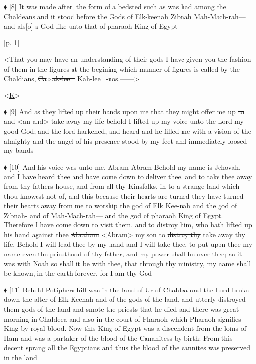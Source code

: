 				$\blacklozenge$ [8]	It was made after, the form of a bedsted such as was had among the Chaldeans and it stood before the Gods of Elk-keenah Zibnah Mah-Mach-rah---and als[o] a God like unto that of pharaoh King of Egypt

				[p. 1]

				<That you may have an understanding of their gods I have given you the fashion of them in the figures at the begining which manner of figures is called by the Chaldians, \sout{Ca$\diamond$ak-lee=} Kah-lee=-nos.------>

				<\uline{K}>

				$\blacklozenge$ [9]	And as they lifted up their hands upon me that they might offer me up \sout{to} \sout{and} <\sout{an} and> take away my life behold I lifted up my voice unto the Lord my \sout{good} God; and the lord harkened, and heard and he filled me with a vision of the almighty and the angel of his presence stood by my feet and immediately loosed my bands

				$\blacklozenge$ [10]	And his voice was unto me. Abram Abram Behold my name is Jehovah. and I have heard thee and have come down to deliver thee. and to take thee away from thy fathers house, and from all thy Kinsfolks, in to a strange land which thou knowest not of, and this because \sout{their} \sout{hearts} \sout{are} \sout{turned} they have turned their hearts away from me to worship the god of Elk Kee-nah and the god of Zibnah- and of Mah-Mach-rah--- and the god of pharaoh King of Egypt. Therefore I have come down to visit them. and to distroy him, who hath lifted up his hand against thee \sout{Abraham} <Abram> my son to \sout{distroy thy} take away thy life, Behold I will lead thee by my hand and I will take thee, to put upon thee my name even the priesthood of thy father, and my power shall be over thee; as it was with Noah so shall it be with thee, that through thy ministry, my name shall be known, in the earth forever, for I am thy God

				$\blacklozenge$ [11]	Behold Potiphers hill was in the land of Ur of Chaldea and the Lord broke down the alter of Elk-Keenah and of the gods of the land, and utterly distroyed them \sout{gods of the land} and smote the priest\sout{s} that he died and there was great morning in Chaldeea and also in the court of Pharaoh which Pharaoh signifies King by royal blood. Now this King of Egypt was a discendent from the loins of Ham and was a partaker of the blood of the Cananitess by birth: From this decent sprang all the Egyptians and thus the blood of the cannites was preserved in the land

